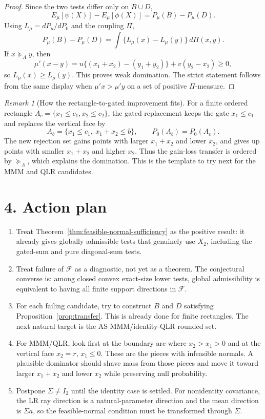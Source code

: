 \documentclass[12pt]{article}
\theoremstyle{remark}
\newtheorem{remark}{Remark}
\begin{document}
\begin{proof}
Since the two tests differ only on $B\cup D$,
\[
E_\mu[\psi(X)]-E_\mu[\phi(X)]
=P_\mu(B)-P_\mu(D).
\]
Using $L_\mu=dP_\mu/dP_0$ and the coupling $\Pi$,
\[
P_\mu(B)-P_\mu(D)
=\int \{L_\mu(x)-L_\mu(y)\}\,d\Pi(x,y).
\]
If $x\succeq_\Lambda y$, then
\[
\mu'(x-y)=u\{(x_1+x_2)-(y_1+y_2)\}+v(y_2-x_2)\ge0,
\]
so $L_\mu(x)\ge L_\mu(y)$. This proves weak domination. The strict statement follows from the same display when $\mu'x>\mu'y$ on a set of positive $\Pi$-measure.
\end{proof}

\begin{remark}[How the rectangle-to-gated improvement fits]
For a finite ordered rectangle $A_c=\{x_1\le c_1,x_2\le c_2\}$, the gated replacement keeps the gate $x_1\le c_1$ and replaces the vertical face by
\[
A_b=\{x_1\le c_1,\ x_1+x_2\le b\},
\qquad
P_0(A_b)=P_0(A_c).
\]
The new rejection set gains points with larger $x_1+x_2$ and lower $x_2$, and gives up points with smaller $x_1+x_2$ and higher $x_2$. Thus the gain-loss transfer is ordered by $\succeq_\Lambda$, which explains the domination. This is the template to try next for the MMM and QLR candidates.
\end{remark}

\section*{4. Action plan}

\begin{enumerate}[leftmargin=2.1em]
\item Treat Theorem~\ref{thm:feasible-normal-sufficiency} as the positive result: it already gives globally admissible tests that genuinely use $X_2$, including the gated-sum and pure diagonal-sum tests.
\item Treat failure of $\mathcal F$ as a diagnostic, not yet as a theorem. The conjectural converse is: among closed convex exact-size lower tests, global admissibility is equivalent to having all finite support directions in $\mathcal F$.
\item For each failing candidate, try to construct $B$ and $D$ satisfying Proposition~\ref{prop:transfer}. This is already done for finite rectangles. The next natural target is the AS MMM/identity-QLR rounded set.
\item For MMM/QLR, look first at the boundary arc where $x_2>x_1>0$ and at the vertical face $x_2=r$, $x_1\le0$. These are the pieces with infeasible normals. A plausible dominator should shave mass from those pieces and move it toward larger $x_1+x_2$ and lower $x_2$ while preserving null probability.
\item Postpone $\Sigma\ne I_2$ until the identity case is settled. For nonidentity covariance, the LR ray direction is a natural-parameter direction and the mean direction is $\Sigma a$, so the feasible-normal condition must be transformed through $\Sigma$.
\end{enumerate}
\end{document}
